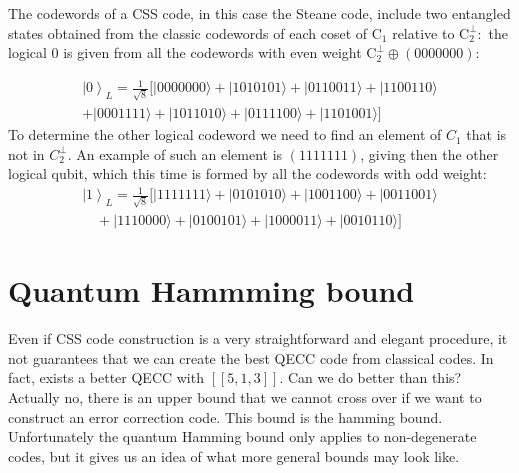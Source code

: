 The codewords of a CSS code, in this case the Steane code, include two entangled states obtained from the classic codewords of each coset of $\mathrm{C}_1$ relative to $\mathrm{C}_2^{\perp}:$ the logical 0 is given from all the codewords with even weight $\mathrm{C}_2^{\perp} \oplus(0000000)$:

$$
\begin{array}{r}
\left|0\right\rangle_L=\frac{1}{\sqrt{8}}[|0000000\rangle+|1010101\rangle+|0110011\rangle+|1100110\rangle \\
+|0001111\rangle+|1011010\rangle+|0111100\rangle+|1101001\rangle]
\end{array}
$$
To determine the other logical codeword we need to find an element of $C_{1}$ that is not in $C^{\perp}_{2}$. An example of such an element is $(1111111)$, giving then the other logical qubit, which this time is formed by all the codewords with odd weight:
$$
\begin{array}{r}
\left|1\right\rangle_L=\frac{1}{\sqrt{8}}[|1111111\rangle+|0101010\rangle+|1001100\rangle+|0011001\rangle \\
\quad+|1110000\rangle+|0100101\rangle+|1000011\rangle+|0010110\rangle]
\end{array}
$$



\section{Quantum Hammming bound}
Even if CSS code construction is a very straightforward and elegant procedure, it not guarantees that we can create the best QECC code from classical codes. In fact, exists a better QECC with $[[5,1,3]]$. Can we do better than this? Actually no, there is an upper bound that we cannot cross over if we want to construct an error correction code. This bound is the hamming bound. 
Unfortunately the quantum Hamming bound only applies to non-degenerate codes, but it gives us an idea of what more general bounds may look like.


